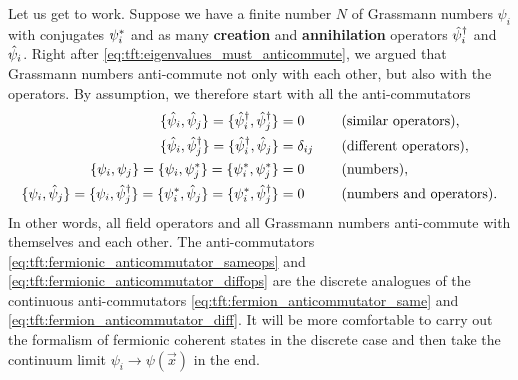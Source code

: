 Let us get to work.
Suppose we have a finite number $N$ of Grassmann numbers $\psi_i$ with conjugates ${\psi}^*_i$ and as many \textbf{creation} and \textbf{annihilation} operators $\hat\psi^\dagger_i$ and $\hat\psi_i$.
Right after \cref{eq:tft:eigenvalues_must_anticommute}, we argued that Grassmann numbers anti-commute not only with each other, but also with the operators.
By assumption, we therefore start with all the anti-commutators
\begin{subequations}%
\begin{align}%
	\acomm{\destr_i}{\destr_j} = \acomm{\creat_i}{\creat_j}                                                             &= 0            && \quad \text{(similar operators)} , \label{eq:tft:fermionic_anticommutator_sameops} \\
	\acomm{\destr_i}{\creat_j} = \acomm{\creat_i}{\destr_j}                                                             &= \delta_{i j} && \quad \text{(different operators)} , \label{eq:tft:fermionic_anticommutator_diffops} \\
	\acomm{\psi_i}{\psi_j} = \acomm{\psi_i}{\conj\psi_j} = \acomm{\conj\psi_i}{\conj\psi_j}                             &= 0            && \quad \text{(numbers)} , \label{eq:tft:fermionic_anticommutator_gnums} \\
	\acomm{\psi_i}{\destr_j} = \acomm{\psi_i}{\creat_j} = \acomm{\conj\psi_i}{\destr_j} = \acomm{\conj\psi_i}{\creat_j} &= 0            && \quad \text{(numbers and operators)} . \label{eq:tft:fermionic_anticommutator_gnum_op}
\end{align}%
\label{eq:tft:fermionic_all_anticommutators}%
\end{subequations}%
In other words, all field operators and all Grassmann numbers anti-commute with themselves and each other.
The anti-commutators \eqref{eq:tft:fermionic_anticommutator_sameops} and \eqref{eq:tft:fermionic_anticommutator_diffops} are the discrete analogues of the continuous anti-commutators \eqref{eq:tft:fermion_anticommutator_same} and \eqref{eq:tft:fermion_anticommutator_diff}.
It will be more comfortable to carry out the formalism of fermionic coherent states in the discrete case and then take the continuum limit $\psi_i \rightarrow \psi(\vec{x})$ in the end.

